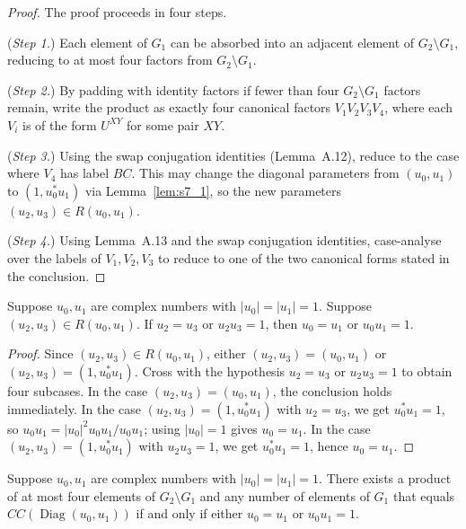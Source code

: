 \begin{proof}
  \leanok
  The proof proceeds in four steps.

  (\emph{Step 1.})
  Each element of $G_1$ can be absorbed into an adjacent
  element of $G_2 \setminus G_1$, reducing to at most four
  factors from $G_2 \setminus G_1$.

  (\emph{Step 2.})
  By padding with identity factors if fewer than four
  $G_2 \setminus G_1$ factors remain, write the product
  as exactly four canonical factors $V_1 V_2 V_3 V_4$,
  where each $V_i$ is of the form $U^{XY}$ for some pair $XY$.

  (\emph{Step 3.})
  Using the swap conjugation identities (Lemma~A.12), reduce
  to the case where $V_4$ has label $BC$.
  This may change the diagonal parameters from $(u_0, u_1)$
  to $(1, u_0^* u_1)$ via Lemma~\ref{lem:s7_1},
  so the new parameters $(u_2, u_3) \in R(u_0, u_1)$.

  (\emph{Step 4.})
  Using Lemma~A.13 and the swap conjugation identities,
  case-analyse over the labels of $V_1, V_2, V_3$ to reduce
  to one of the two canonical forms stated in the conclusion.
\end{proof}

\begin{lemma}
  \label{lem:s7_3}
  \leanok
  Suppose $u_0, u_1$ are complex numbers with $|u_0| = |u_1| = 1$.
  Suppose $(u_2, u_3) \in R(u_0, u_1)$.
  If $u_2 = u_3$ or $u_2 u_3 = 1$,
  then $u_0 = u_1$ or $u_0 u_1 = 1$.
\end{lemma}

\begin{proof}
  \leanok
  Since $(u_2, u_3) \in R(u_0, u_1)$, either
  $(u_2, u_3) = (u_0, u_1)$ or $(u_2, u_3) = (1, u_0^* u_1)$.
  Cross with the hypothesis $u_2 = u_3$ or $u_2 u_3 = 1$
  to obtain four subcases.
  In the case $(u_2, u_3) = (u_0, u_1)$, the conclusion holds
  immediately.
  In the case $(u_2, u_3) = (1, u_0^* u_1)$ with $u_2 = u_3$,
  we get $u_0^* u_1 = 1$, so $u_0 u_1 = |u_0|^2 u_0 u_1 / u_0 u_1$;
  using $|u_0| = 1$ gives $u_0 = u_1$.
  In the case $(u_2, u_3) = (1, u_0^* u_1)$ with $u_2 u_3 = 1$,
  we get $u_0^* u_1 = 1$, hence $u_0 = u_1$.
\end{proof}

\begin{theorem}
  \label{thm:s7_4}
  \leanok
  Suppose $u_0, u_1$ are complex numbers with $|u_0| = |u_1| = 1$.
  There exists a product of at most four elements of
  $G_2 \setminus G_1$ and any number of elements of $G_1$ that equals
  $CC(\operatorname{Diag}(u_0, u_1))$ if and only if
  either $u_0 = u_1$ or $u_0 u_1 = 1$.
\end{theorem}

